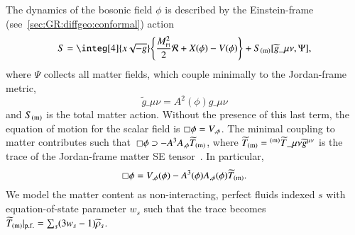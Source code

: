     The dynamics of the bosonic field $\phi$ is described by the Einstein-frame (see~\cref{sec:GR:diffgeo:conformal}) action%
    \begin{equation}\label{eq:cosmo:quintessence:quintessence_action_Einstein}
        S =\integ[4]{x\sqrt{-g}} \cclosed{ \frac{M\nped{Pl}^2}{2} \mathcal{R} + X(\phi) - V(\phi)} + S\ped{(m)}[\widetilde{g}\_{\mu\nu} , \Psi],
    \end{equation} 
    where $\Psi$ collects all matter fields, which couple minimally to the Jordan-frame metric,
    \begin{equation}
        \widetilde{g}\_{\mu\nu} = A^2 (\phi) g\_{\mu\nu}%
    \end{equation}
    and $S_\mathrm{(m)}$ is the total matter action. 
    Without the presence of this last term, the equation of motion for the scalar field is $\sq \phi = V_{,\phi}$. %
    The minimal coupling to matter contributes such that~$\sq\phi \supset - A^{3} A_{,\phi}\widetilde{T}\ped{(m)}$, where $\widetilde{T}\ped{(m)}= {}\ap{(m)}\widetilde{T}\_{\mu\nu}\widetilde{g}\^{\mu\nu}$ is the trace of the Jordan-frame matter SE tensor~\citep{hinterbichlerSymmetronCosmology2011,christiansenAsevolutionRelativisticNbody2023}. In particular, 
    \begin{equation}
        \sq\phi = V_{,\phi}(\phi) - A^{3}(\phi) A_{,\phi}(\phi)\widetilde{T}\ped{(m)}.
    \end{equation}
    We model the matter content as non-interacting, perfect fluids indexed $s$ with equation-of-state parameter $w_s$ such that the trace becomes $\widetilde{T}_\mathrm{(m)}\rvert_\mathrm{p.f.} = \sum_s (3w_s-1 )\widetilde{\rho}_s$.  
